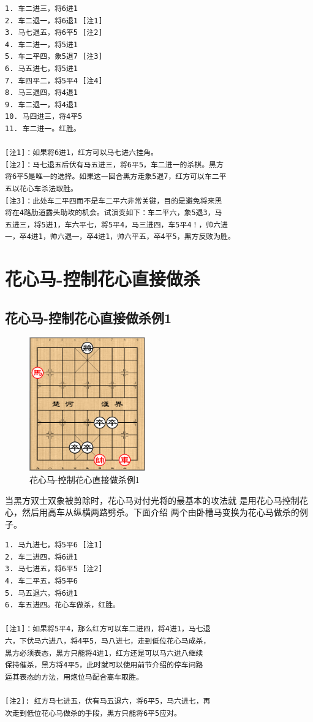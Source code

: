 \documentclass[a5paper,twoside]{book}
\begin{document}
\begin{verbatim}
1. 车二进三，将6进1
2. 车二退一，将6退1 [注1]
3. 马七退五，将6平5 [注2]
4. 车二进一，将5进1
5. 车二平四，象5退7 [注3]
6. 马五进七，将5进1
7. 车四平二，将5平4 [注4]
8. 马三退四，将4退1
9. 车二退一，将4退1
10. 马四进三，将4平5
11. 车二进一。红胜。   
   
[注1]：如果将6进1，红方可以马七进六挂角。
[注2]：马七退五后伏有马五进三，将6平5，车二进一的杀棋。黑方
将6平5是唯一的选择。如果这一回合黑方走象5退7，红方可以车二平
五以花心车杀法取胜。
[注3]：此处车二平四而不是车二平六非常关键，目的是避免将来黑
将在4路肋道露头助攻的机会。试演变如下：车二平六，象5退3，马
五进三，将5进1，车六平七，将5平4，马三进四，车5平4！，帅六进
一，卒4进1，帅六退一，卒4进1，帅六平五，卒4平5，黑方反败为胜。
\end{verbatim}

\section{花心马-控制花心直接做杀}
\label{sec-5-3}

\subsection{花心马-控制花心直接做杀例1}
\label{sec-5-3-1}

\begin{figure}[H]
\centering
\includegraphics[width=5cm]{pic/花心马-控制花心直接做杀.png}
\caption{花心马-控制花心直接做杀例1}
\end{figure}


当黑方双士双象被剪除时，花心马对付光将的最基本的攻法就
是用花心马控制花心，然后用高车从纵横两路劈杀。下面介绍
两个由卧槽马变换为花心马做杀的例子。

\begin{verbatim}
1. 马九进七，将5平6 [注1]
2. 车二进四，将6进1   
3. 马七进五，将6平5 [注2]
4. 车二平五，将5平6
5. 马五退六，将6进1
6. 车五进四。花心车做杀，红胜。
   
[注1]：如果将5平4，那么红方可以车二进四，将4进1，马七退
六，下伏马六进八，将4平5，马八进七，走到低位花心马成杀，
黑方必须表态，黑方只能将4进1，红方还是可以马六进八继续
保持催杀，黑方将4平5，此时就可以使用前节介绍的停车问路
逼其表态的方法，用炮位马配合高车取胜。

[注2]: 红方马七进五，伏有马五退六，将6平5，马六进七，再
次走到低位花心马做杀的手段，黑方只能将6平5应对。
\end{verbatim}
\end{document}
